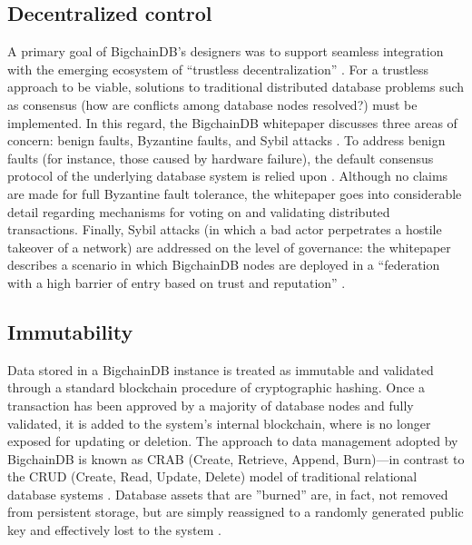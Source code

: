 \documentclass[sigconf]{acmart}
\begin{document}
\subsection{Decentralized control}
A primary goal of BigchainDB's designers was to support seamless integration with the emerging ecosystem of ``trustless decentralization'' \cite{bigDB16}. For a trustless approach to be viable, solutions to traditional distributed database problems such as consensus (how are conflicts among database nodes resolved?) must be implemented. In this regard, the BigchainDB whitepaper discusses three areas of concern: benign faults, Byzantine faults, and Sybil attacks \cite{bigDB16}. To address benign faults (for instance, those caused by hardware failure), the default consensus protocol of the underlying database system is relied upon \citep{bigDB16}. Although no claims are made for full Byzantine fault tolerance, the whitepaper goes into considerable detail regarding mechanisms for voting on and validating distributed transactions. Finally, Sybil attacks (in which a bad actor perpetrates a hostile takeover of a network) are addressed on the level of governance: the whitepaper describes a scenario in which BigchainDB nodes are deployed in a ``federation with a high barrier of entry based on trust and reputation'' \citep{bigDB16}.

\subsection{Immutability}
Data stored in a BigchainDB instance is treated as immutable and validated through a standard blockchain procedure of cryptographic hashing. Once a transaction has been approved by a majority of database nodes and fully validated, it is added to the system's internal blockchain, where is no longer exposed for updating or deletion. The approach to data management adopted by BigchainDB is known as CRAB (Create, Retrieve, Append, Burn)---in contrast to the CRUD (Create, Read, Update, Delete) model of traditional relational database systems \cite{jP17}. Database assets that are ''burned'' are, in fact, not removed from persistent storage, but are simply reassigned to a randomly generated public key and effectively lost to the system \citep{jP17}.
\end{document}
